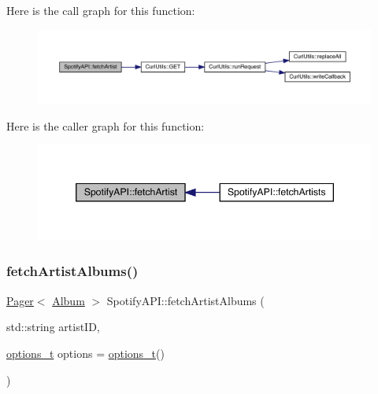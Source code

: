 Here is the call graph for this function\+:
\nopagebreak
\begin{figure}[H]
\begin{center}
\leavevmode
\includegraphics[width=350pt]{class_spotify_a_p_i_a6ef5675e1ace89ae83576e424f71c785_cgraph}
\end{center}
\end{figure}
Here is the caller graph for this function\+:
\nopagebreak
\begin{figure}[H]
\begin{center}
\leavevmode
\includegraphics[width=346pt]{class_spotify_a_p_i_a6ef5675e1ace89ae83576e424f71c785_icgraph}
\end{center}
\end{figure}
\mbox{\label{class_spotify_a_p_i_a565dbf6b925da78ef7ef355447b61a9f}} 
\subsubsection{\texorpdfstring{fetch\+Artist\+Albums()}{fetchArtistAlbums()}}
{\footnotesize\ttfamily \mbox{\hyperlink{class_pager}{Pager}}$<$ \mbox{\hyperlink{class_album}{Album}} $>$ Spotify\+A\+P\+I\+::fetch\+Artist\+Albums (\begin{DoxyParamCaption}\item[{std\+::string}]{artist\+ID,  }\item[{\mbox{\hyperlink{_spotify_a_p_i_8h_a0ff5cac1a4007bb330b7d9939650c283}{options\+\_\+t}}}]{options = {\ttfamily \mbox{\hyperlink{_spotify_a_p_i_8h_a0ff5cac1a4007bb330b7d9939650c283}{options\+\_\+t}}()} }\end{DoxyParamCaption})}




